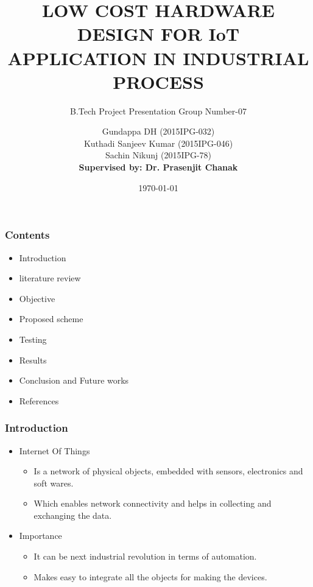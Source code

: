 \documentclass{beamer}
\title[]{LOW COST HARDWARE DESIGN FOR IoT
APPLICATION IN INDUSTRIAL PROCESS}
\author{B.Tech Project Presentation Group Number-07}
\author{Gundappa DH (2015IPG-032)\\
        Kuthadi Sanjeev Kumar (2015IPG-046)\\
        Sachin Nikunj (2015IPG-78)\\
\vspace{6mm}
\textbf{Supervised by: Dr. Prasenjit Chanak}}
\institute[]{
	
	ABV-Indian Institute of Information Technology and\\
	Management, Gwalior
}
\date{\today}
\begin{document}
	\frame{\titlepage}
	
	
	\begin{frame}\frametitle{Contents}
	\begin{itemize}
		\item	Introduction
		\item   literature review 
		\item   Objective 
		\item	Proposed scheme
		\item   Testing
		\item	Results
		\item   Conclusion and Future works
		\item   References
	\end{itemize}
\end{frame}
\begin{frame}\frametitle{Introduction}
\begin{itemize}
\item Internet Of Things
\begin{itemize}
	\item Is a network of physical objects, embedded with sensors, electronics and soft wares.	 
	\item Which enables network connectivity and helps in collecting and exchanging the data.	  
\end{itemize}
\item Importance
\begin{itemize}
\item It can be next industrial revolution in terms of automation. 
\item Makes easy to integrate all the objects for making the devices.
\end{itemize}
\end{itemize}
\end{frame}
\end{document}
